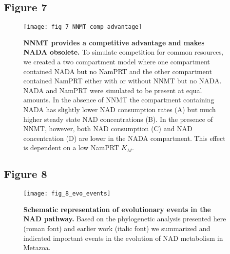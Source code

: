 \newpage


\subsection*{Figure 7}

\begin{figure}[ht]
  \centering
  \texttt{[image: fig\_7\_NNMT\_comp\_advantage]}
  \caption{\textbf{NNMT provides a competitive advantage and makes NADA obsolete.} To simulate competition for common resources, we created a two compartment model where one compartment contained NADA but no NamPRT and the other compartment contained NamPRT either with or without NNMT but no NADA. NADA and NamPRT were simulated to be present at equal amounts. In the absence of NNMT the compartment containing NADA has slightly lower NAD consumption rates (A) but much higher steady state NAD concentrations (B). In the presence of NNMT, however, both NAD consumption (C) and NAD concentration (D) are lower in the NADA compartment. This effect is dependent on a low NamPRT $K_{M}$.}
  \label{fig:NNMT_comp_advantage}
\end{figure}

\newpage


\subsection*{Figure 8}

\begin{figure}[ht]
  \centering
  \texttt{[image: fig\_8\_evo\_events]}
  \caption{\textbf{Schematic representation of evolutionary events in the NAD pathway.} Based on the phylogenetic analysis presented here (roman font) and earlier work \cite{Lau2010} (italic font) we summarized and indicated important events in the evolution of NAD metabolism in Metazoa.}
  \label{fig:evo_events}
\end{figure}
